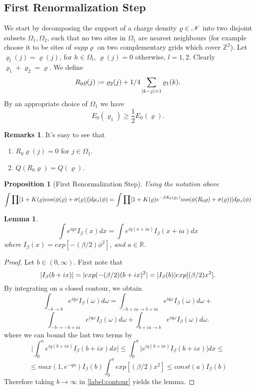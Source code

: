 \documentclass[11pt,reqno]{article}
\DeclarePairedDelimiter\abs{\lvert}{\rvert}%
\newtheorem{lemma}[thm]{Lemma}
\newtheorem{prop}[thm]{Proposition}
\theoremstyle{definition}
\newtheorem*{remarks}{Remarks}
\numberwithin{equation}{section}
\begin{document}
\subsection{First Renormalization Step}

We start by decomposing the support of a charge density $\varrho \in \mathscr{N}$ into two disjoint subsets $\Omega_1, \Omega_2$, such that no two sites in $\Omega_1$ are nearest neighbours (for example choose it to be sites of $supp\varrho$ on two complementary grids which cover $\mathbb{Z}^2$). Let $\varrho_l(j) = \varrho(j)$, for $h \in \Omega_l$, $\varrho(j)=0$ otherwise, $l=1,2$. Clearly $\varrho_1 + \varrho_2 = \varrho$. We define
$$
R_0\varrho(j) := \varrho_2(j) + 1/4\sum_{\abs{k-j}=1}\varrho_1(k).
$$
By an appropriate choice of $\Omega_1$ we have
\begin{equation} \label{label:lab419}
E_0(\varrho_1) \geq \frac{1}{2} E_0(\varrho).
\end{equation}

\begin{remarks}
It's easy to see that
\begin{enumerate}
\item $R_0\varrho(j) = 0$ for $j\in\Omega_1$.
\item $Q(R_0\varrho) = Q(\varrho)$.
\end{enumerate}
\end{remarks}


\begin{prop}[First Renormalization Step] \label{prop:lem418}
Using the notation above
$$
\int \prod [1+K(\varrho)cos(\phi(\varrho) + \sigma(\varrho))] d\mu_{\text{\tiny$\beta$}}(\phi) = 
\int \prod [1+K(\varrho)e^{-\beta E_0(\varrho_1)}cos(\phi(R_0\varrho) + \sigma(\varrho))] d\mu_{\text{\tiny$\beta$}}(\phi)
$$
\end{prop}


\begin{lemma} \label{lemma:contour}
\begin{equation}
\int e^{i q x} I_\beta(x)dx = \int e^{i q (x+ia)} I_\beta(x+ia)dx
\end{equation}
where $I_\beta(x) = exp[-(\beta/2)\phi^2]$, and $a\in \mathbb{R}$.
\end{lemma}
\begin{proof}
Let $b \in (0,\infty)$. First note that 
$$
\abs{I_\beta(b+ix)} = \abs{exp(-(\beta/2) (b+ix)^2} = \abs{I_\beta(b)}exp[(\beta/2)x^2].
$$
By integrating on a closed contour, we obtain
$$
\int_{-b \rightarrow b} e^{i q \omega} I_\beta(\omega)d\omega =
\int_{-b+ia \rightarrow b+ia} e^{i q \omega} I_\beta(\omega)d\omega + 
$$
\begin{equation} \label{label:contour}
\int_{-b \rightarrow -b+ia} e^{i q \omega} I_\beta(\omega)d\omega +
\int_{b+ia \rightarrow b} e^{i q \omega} I_\beta(\omega)d\omega.
\end{equation}
where we can bound the last two terms by
$$
\Bigg| \int_0^a e^{iq(b+ix)}I_\beta(b+ix)dx \Bigg| \leq 
\int_0^a \Big| e^{iq(b+ix)}I_\beta(b+ix)\Big| dx \leq
$$
$$
\leq max(1, e^{-qa}) I_\beta(b) \int_0^a exp[(\beta/2)x^2] \leq const(a)I_\beta(b)
$$
Therefore taking $b\rightarrow\infty$ in \eqref{label:contour} yields the lemma.
\end{proof}
\end{document}
